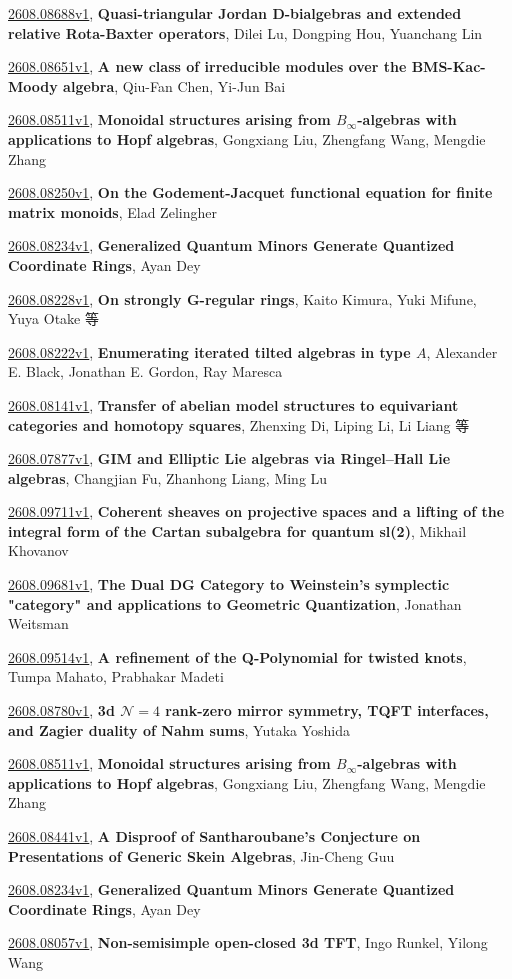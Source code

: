 \documentclass[9pt, a4paper]{article}
\theoremstyle{plain}
\theoremstyle{definition}
\theoremstyle{remark}
\newcommand{\arxiv}[3]{\href{https://arxiv.org/abs/#1}{#1}, \textbf{\textcolor{arxivblue}{#2}}, #3}
\begin{document}
\arxiv{2608.08688v1}{Quasi-triangular Jordan D-bialgebras and extended relative Rota-Baxter operators}{Dilei Lu, Dongping Hou, Yuanchang Lin}

\arxiv{2608.08651v1}{A new class of irreducible modules over the BMS-Kac-Moody algebra}{Qiu-Fan Chen, Yi-Jun Bai}

\arxiv{2608.08511v1}{Monoidal structures arising from $B_\infty$-algebras with applications to Hopf algebras}{Gongxiang Liu, Zhengfang Wang, Mengdie Zhang}

\arxiv{2608.08250v1}{On the Godement-Jacquet functional equation for finite matrix monoids}{Elad Zelingher}

\arxiv{2608.08234v1}{Generalized Quantum Minors Generate Quantized Coordinate Rings}{Ayan Dey}

\arxiv{2608.08228v1}{On strongly G-regular rings}{Kaito Kimura, Yuki Mifune, Yuya Otake 等}

\arxiv{2608.08222v1}{Enumerating iterated tilted algebras in type $A$}{Alexander E. Black, Jonathan E. Gordon, Ray Maresca}

\arxiv{2608.08141v1}{Transfer of abelian model structures to equivariant categories and homotopy squares}{Zhenxing Di, Liping Li, Li Liang 等}

\arxiv{2608.07877v1}{GIM and Elliptic Lie algebras via Ringel--Hall Lie algebras}{Changjian Fu, Zhanhong Liang, Ming Lu}

\arxiv{2608.09711v1}{Coherent sheaves on projective spaces and a lifting of the integral form of the Cartan subalgebra for quantum sl(2)}{Mikhail Khovanov}

\arxiv{2608.09681v1}{The Dual DG Category to Weinstein's symplectic "category" and applications to Geometric Quantization}{Jonathan Weitsman}

\arxiv{2608.09514v1}{A refinement of the Q-Polynomial for twisted knots}{Tumpa Mahato, Prabhakar Madeti}

\arxiv{2608.08780v1}{3d $\mathcal N=4$ rank-zero mirror symmetry, TQFT interfaces, and Zagier duality of Nahm sums}{Yutaka Yoshida}

\arxiv{2608.08511v1}{Monoidal structures arising from $B_\infty$-algebras with applications to Hopf algebras}{Gongxiang Liu, Zhengfang Wang, Mengdie Zhang}

\arxiv{2608.08441v1}{A Disproof of Santharoubane's Conjecture on Presentations of Generic Skein Algebras}{Jin-Cheng Guu}

\arxiv{2608.08234v1}{Generalized Quantum Minors Generate Quantized Coordinate Rings}{Ayan Dey}

\arxiv{2608.08057v1}{Non-semisimple open-closed 3d TFT}{Ingo Runkel, Yilong Wang}

\end{document}
